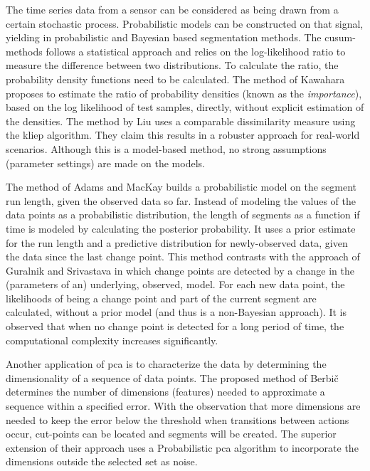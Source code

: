 The time series data from a sensor can be considered as being drawn from a certain stochastic process.
Probabilistic models can be constructed on that signal, yielding in probabilistic and Bayesian based segmentation methods.
The \gls{cusum}-methods follows a statistical approach and relies on the log-likelihood ratio \cite{gustafsson1996marginalized} to measure the difference between two distributions.
To calculate the ratio, the probability density functions need to be calculated.
The method of Kawahara \etal \cite{kawahara2009change} proposes to estimate the ratio of probability densities (known as the \emph{importance}), based on the log likelihood of test samples, directly, without explicit estimation of the densities.
The method by Liu \etal \cite{liu2013change} uses a comparable dissimilarity measure using the \gls{kliep} algorithm.
They claim this results in a robuster approach for real-world scenarios.
Although this is a model-based method, no strong assumptions (parameter settings) are made on the models.

The method of Adams and MacKay \cite{adams2007bayesian} builds a probabilistic model on the segment run length, given the observed data so far.
Instead of modeling the values of the data points as a probabilistic distribution, the length of segments as a function if time is modeled by calculating the posterior probability.
It uses a prior estimate for the run length and a predictive distribution for newly-observed data, given the data since the last change point.
This method contrasts with the approach of Guralnik and Srivastava \cite{guralnik1999event} in which change points are detected by a change in the (parameters of an) underlying, observed, model.
For each new data point, the likelihoods of being a change point and part of the current segment are calculated, without a prior model (and thus is a non-Bayesian approach).
It is observed that when no change point is detected for a long period of time, the computational complexity increases significantly.

Another application of \gls{pca} is to characterize the data by determining the dimensionality of a sequence of data points.
The proposed method of Berbi\v{c} \etal \cite{barbivc2004segmenting} determines the number of dimensions (features) needed to approximate a sequence within a specified error.
With the observation that more dimensions are needed to keep the error below the threshold when transitions between actions occur, cut-points can be located and segments will be created.
The superior extension of their approach uses a Probabilistic \gls{pca} algorithm to incorporate the dimensions outside the selected set as noise.

